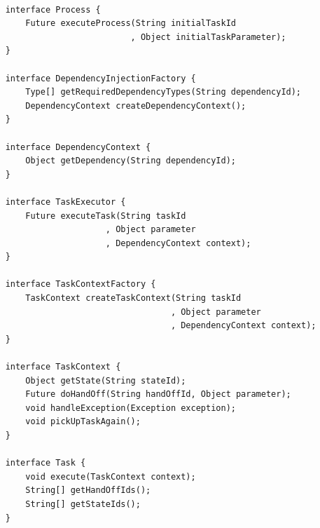 \documentclass[prodmode]{style/acmlarge}
\begin{document}
\lstset{caption=Task collaboration pattern interfaces\protect\footnotemark.}
\begin{lstlisting}[float,label=lst:TaskCollaborationInterfaces]

    interface Process {
        Future executeProcess(String initialTaskId
                             , Object initialTaskParameter);
    }

    interface DependencyInjectionFactory {
        Type[] getRequiredDependencyTypes(String dependencyId);
        DependencyContext createDependencyContext();
    }
    
    interface DependencyContext {
        Object getDependency(String dependencyId);
    }

    interface TaskExecutor {
        Future executeTask(String taskId 
                        , Object parameter
                        , DependencyContext context);
    }

    interface TaskContextFactory {
        TaskContext createTaskContext(String taskId
                                     , Object parameter
                                     , DependencyContext context);
    }

    interface TaskContext {
        Object getState(String stateId);
        Future doHandOff(String handOffId, Object parameter);
        void handleException(Exception exception);
        void pickUpTaskAgain();
    }

    interface Task {
        void execute(TaskContext context);
        String[] getHandOffIds();
        String[] getStateIds();
    }
\end{lstlisting}
\end{document}
